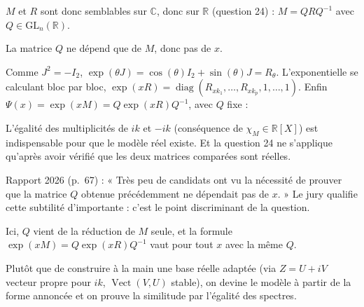 \documentclass[11pt,a4paper]{article}
\newcommand{\equationajustee}[1]{%
  \sbox{\boiteequation}{$\displaystyle #1$}%
  \ifdim\wd\boiteequation>\linewidth
    \[\resizebox{\linewidth}{!}{\usebox{\boiteequation}}\]%
  \else
    \[#1\]%
  \fi}
\begin{document}
\(M\) et \(R\) sont donc semblables sur \(\mathbb{C}\), donc sur \(\mathbb{R}\) (question 24) : \(M=QRQ^{-1}\) avec \(Q\in{\mathrm{GL}}_n(\mathbb{R})\).

La matrice \(Q\) ne dépend que de \(M\), donc pas de \(x\).

Comme \(J^2=-I_2\), \(\exp(\theta J)=\cos(\theta)I_2+\sin(\theta)J=R_\theta\). L'exponentielle se calculant bloc par bloc, \(\exp(xR)=\operatorname{diag}(R_{xk_1},\allowbreak \dots,\allowbreak R_{xk_p},\allowbreak 1,\allowbreak \dots,\allowbreak 1)\). Enfin \(\Psi(x)=\exp(xM)=Q\exp(xR)Q^{-1}\), avec \(Q\) fixe :

\equationajustee{\boxed{\forall x\in\mathbb{R},\ \Psi(x)=Q\begin{pmatrix}R_{xk_1}&&&&&\\&\ddots&&&&\\&&R_{xk_p}&&&\\&&&1&&\\&&&&\ddots&\\&&&&&1\end{pmatrix}Q^{-1}.}}

\begin{piege}

L'égalité des multiplicités de \(ik\) et \(-ik\) (conséquence de \(\chi_M\in\mathbb{R}[X]\)) est indispensable pour que le modèle réel existe. Et la question 24 ne s'applique qu'après avoir vérifié que les deux matrices comparées sont réelles.

\end{piege}

\begin{jury}

Rapport 2026 (p.~67) : « Très peu de candidats ont vu la nécessité de prouver que la matrice \(Q\) obtenue précédemment ne dépendait pas de \(x\). » Le jury qualifie cette subtilité d'importante : c'est le point discriminant de la question.

Ici, \(Q\) vient de la réduction de \(M\) seule, et la formule \(\exp(xM)=Q\exp(xR)Q^{-1}\) vaut pour tout \(x\) avec la même \(Q\).

\end{jury}

\begin{methode}

Plutôt que de construire à la main une base réelle adaptée (via \(Z=U+iV\) vecteur propre pour \(ik\), \(\operatorname{Vect}(V,U)\) stable), on devine le modèle à partir de la forme annoncée et on prouve la similitude par l'égalité des spectres.

\end{methode}
\end{document}
